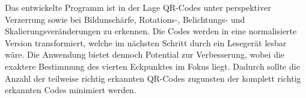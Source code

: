 \documentclass[a4paper, oneside, 12pt]{article}
\begin{document}
Das entwickelte Programm ist in der Lage QR-Codes unter perspektiver Verzerrung sowie bei Bildunschärfe, Rotations-, Belichtungs- und Skalierungsveränderungen zu erkennen. Die Codes werden in eine normalisierte Version transformiert, welche im nächsten Schritt durch ein Lesegerät lesbar wäre. Die Anwendung bietet dennoch Potential zur Verbesserung, wobei die exaktere Bestimmung des vierten Eckpunktes im Fokus liegt. Dadurch sollte die Anzahl der teilweise richtig erkannten QR-Codes zugunsten der komplett richtig erkannten Codes minimiert werden.


\newpage

\nocite{*}


\end{document}
